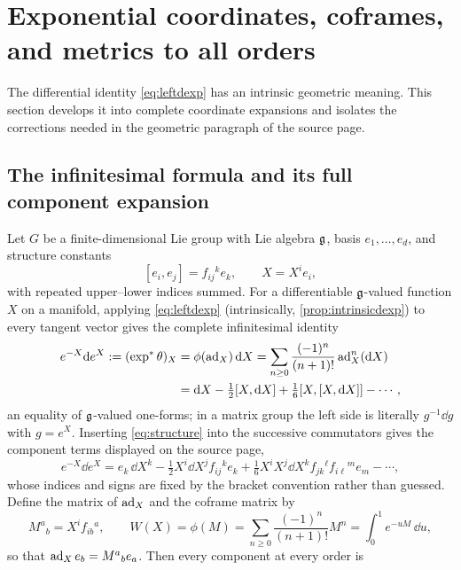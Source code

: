 \section{Exponential coordinates, coframes, and metrics to all orders}\label{sec:geometry}
The differential identity \eqref{eq:leftdexp} has an intrinsic geometric
meaning. This section develops it into complete coordinate expansions and
isolates the corrections needed in the geometric paragraph of the source
page.

\subsection{The infinitesimal formula and its full component expansion}
Let $G$ be a finite-dimensional Lie group with Lie algebra $\mathfrak{g}$, basis
$e_1,\ldots,e_d$, and structure constants
\begin{equation}\label{eq:structure}
 [e_i,e_j]=f_{ij}{}^{k}e_k,\qquad X=X^ie_i,
\end{equation}
with repeated upper--lower indices summed. For a differentiable
$\mathfrak{g}$-valued function $X$ on a manifold, applying \eqref{eq:leftdexp}
(intrinsically, \cref{prop:intrinsicdexp}) to every tangent vector gives
the complete infinitesimal identity
\begin{equation}\label{eq:infinitesimal}
\begin{aligned}
 e^{-X}\mathrm{d} e^X:=(\exp^*\theta)_X&=\phi(\operatorname{ad}_X)\,\mathrm{d} X
 =\sum_{n\geq0}\frac{(-1)^n}{(n+1)!}\operatorname{ad}_X^n(\mathrm{d} X)\\
 &=\mathrm{d} X-\tfrac12[X,\mathrm{d} X]+\tfrac16[X,[X,\mathrm{d} X]]-\cdots,
\end{aligned}
\end{equation}
an equality of $\mathfrak{g}$-valued one-forms; in a matrix group the left side is
literally $g^{-1}\dd g$ with $g=e^X$. Inserting \eqref{eq:structure} into
the successive commutators gives the component terms displayed on the
source page,
\begin{equation}\label{eq:components}
 e^{-X}\dd e^X=e_k\,\dd X^k-\tfrac12X^i\dd X^jf_{ij}{}^ke_k
 +\tfrac16X^iX^j\dd X^kf_{jk}{}^{\ell}f_{i\ell}{}^me_m-\cdots,
\end{equation}
whose indices and signs are fixed by the bracket convention rather than
guessed. Define the matrix of $\operatorname{ad}_X$ and the coframe matrix by
\begin{equation}\label{eq:MW}
 M^a{}_b=X^if_{ib}{}^a,\qquad
 W(X)=\phi(M)=\sum_{n\geq0}\frac{(-1)^n}{(n+1)!}M^n=\int_0^1e^{-uM}\,\dd u,
\end{equation}
so that $\operatorname{ad}_Xe_b=M^a{}_be_a$. Then every component at every order is
